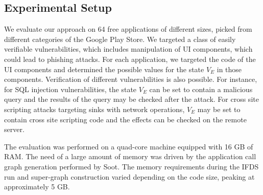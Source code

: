 \subsection{Experimental Setup}
We evaluate our approach on 64 free applications of different sizes, picked from different categories of the Google Play Store. { \color{orange}We targeted a class of easily verifiable vulnerabilities, which includes manipulation of UI components, which could lead to phishing attacks. For each application, we targeted the code of the UI components and determined the possible values for the state $V_E$ in those components. Verification of different vulnerabilities is also possible. For instance, for SQL injection vulnerabilities, the state $V_E$ can be set to contain a malicious query and the results of the query may be checked after the attack. For cross site scripting attacks targeting sinks with network operations, $V_E$ may be set to contain cross site scripting code and the effects can be checked on the remote server.} 

The evaluation was performed on a quad-core machine equipped with 16 GB of RAM. The need of a large amount of memory was driven by the application call graph generation performed by Soot. The memory requirements during the IFDS run and super-graph construction varied depending on the code size, peaking at approximately 5 GB.


